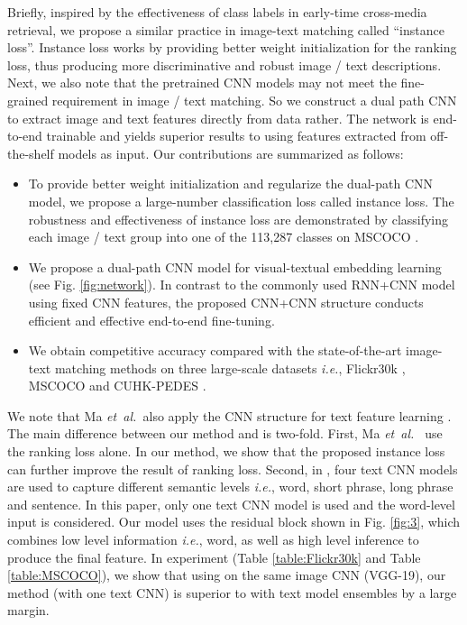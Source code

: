 \documentclass[10pt,final,journal]{IEEEtran}
\newcommand{\etal}{\mbox{\emph{et al.\ }}}
\newcommand{\ie}{\mbox{\emph{i.e.}}}
\begin{document}
Briefly, inspired by the effectiveness of class labels in early-time cross-media retrieval, we propose a similar practice in image-text matching called ``instance loss''. Instance loss works by providing better weight initialization for the ranking loss, thus producing more discriminative and robust image / text descriptions.  Next, we also note that the pretrained CNN models may not meet the fine-grained requirement in image / text matching. So we construct a dual path CNN to extract image and text features directly from data rather. The network is end-to-end trainable and yields superior results to using features extracted from off-the-shelf models as input.  
Our contributions are summarized as follows: 

\begin{itemize}
\item To provide better weight initialization and regularize the dual-path CNN model, we propose a large-number classification loss called instance loss. The robustness and effectiveness of instance loss are demonstrated by classifying each image / text group into one of the 113,287 classes on MSCOCO \cite{lin2014microsoft}.
\item We propose a dual-path CNN model for visual-textual embedding learning  (see Fig. \ref{fig:network}). In contrast to the commonly used RNN+CNN model using fixed CNN features, the proposed CNN+CNN structure conducts efficient and effective end-to-end fine-tuning.
\item We obtain competitive accuracy compared with the state-of-the-art image-text matching methods on three large-scale datasets \ie, Flickr30k \cite{young2014image}, MSCOCO \cite{lin2014microsoft} and CUHK-PEDES \cite{li2017person}.
\end{itemize}

We note that Ma \etal also apply the CNN structure for text feature learning \cite{ma2015multimodal}. The main difference between our method and \cite{ma2015multimodal} is two-fold. First, Ma \etal \cite{ma2015multimodal}  use the ranking loss alone. In our method, we show that the proposed instance loss can further improve the result of ranking loss. Second, in \cite{ma2015multimodal}, four text CNN models are used to capture different semantic levels \ie, word, short phrase, long phrase and sentence. In this paper, only one text CNN model is used and the word-level input is considered. Our model uses the residual block shown in Fig. \ref{fig:3}, which combines low level information \ie, word, as well as high level inference to produce the final feature. In experiment (Table \ref{table:Flickr30k} and Table \ref{table:MSCOCO}), we show that using on the same image CNN (VGG-19), our method (with one text CNN) is superior to \cite{ma2015multimodal} with text model ensembles by a large margin.
\end{document}
